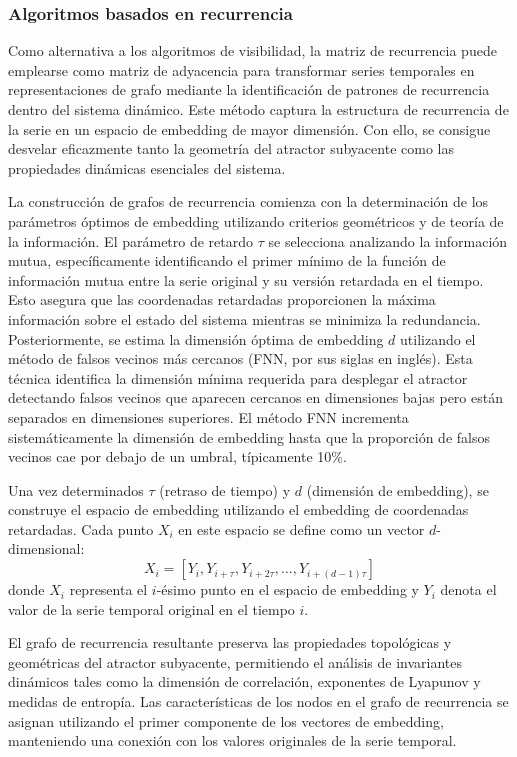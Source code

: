 \documentclass[11pt,a4paper]{article}
\begin{document}
\subsubsection{Algoritmos basados en recurrencia}

Como alternativa a los algoritmos de visibilidad, la matriz de recurrencia puede emplearse como matriz de adyacencia para transformar series temporales en representaciones de grafo mediante la identificación de patrones de recurrencia dentro del sistema dinámico. Este método captura la estructura de recurrencia de la serie en un espacio de embedding de mayor dimensión. Con ello, se consigue desvelar eficazmente tanto la geometría del atractor subyacente como las propiedades dinámicas esenciales del sistema.

La construcción de grafos de recurrencia comienza con la determinación de los parámetros óptimos de embedding utilizando criterios geométricos y de teoría de la información. El parámetro de retardo $\tau$ se selecciona analizando la información mutua, específicamente identificando el primer mínimo de la función de información mutua entre la serie original y su versión retardada en el tiempo. Esto asegura que las coordenadas retardadas proporcionen la máxima información sobre el estado del sistema mientras se minimiza la redundancia. Posteriormente, se estima la dimensión óptima de embedding $d$ utilizando el método de falsos vecinos más cercanos (FNN, por sus siglas en inglés). Esta técnica identifica la dimensión mínima requerida para desplegar el atractor detectando falsos vecinos que aparecen cercanos en dimensiones bajas pero están separados en dimensiones superiores. El método FNN incrementa sistemáticamente la dimensión de embedding hasta que la proporción de falsos vecinos cae por debajo de un umbral, típicamente 10\%.

Una vez determinados $\tau$ (retraso de tiempo) y $d$ (dimensión de embedding), se construye el espacio de embedding utilizando el embedding de coordenadas retardadas. Cada punto $X_i$ en este espacio se define como un vector $d$-dimensional:
\begin{equation}
X_i = [Y_i, Y_{i+\tau}, Y_{i+2\tau}, \ldots, Y_{i+(d-1)\tau}]
\end{equation}
donde $X_i$ representa el $i$-ésimo punto en el espacio de embedding y $Y_i$ denota el valor de la serie temporal original en el tiempo $i$.

El grafo de recurrencia resultante preserva las propiedades topológicas y geométricas del atractor subyacente, permitiendo el análisis de invariantes dinámicos tales como la dimensión de correlación, exponentes de Lyapunov y medidas de entropía. Las características de los nodos en el grafo de recurrencia se asignan utilizando el primer componente de los vectores de embedding, manteniendo una conexión con los valores originales de la serie temporal.
\end{document}
